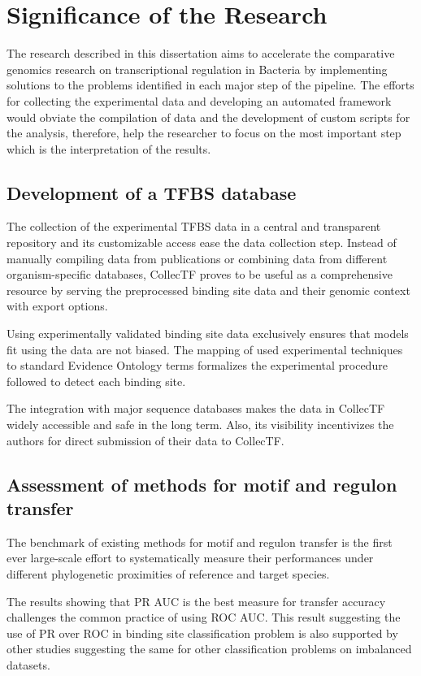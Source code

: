 \section{Significance of the Research}

The research described in this dissertation aims to accelerate the comparative
genomics research on transcriptional regulation in Bacteria by implementing
solutions to the problems identified in each major step of the pipeline. The
efforts for collecting the experimental data and developing an automated
framework would obviate the compilation of data and the development of custom
scripts for the analysis, therefore, help the researcher to focus on the
most important step which is the interpretation of the results.

\subsection{Development of a TFBS database}

The collection of the experimental TFBS data in a central and transparent
repository and its customizable access ease the data collection step. Instead
of manually compiling data from publications or combining data from different
organism-specific databases, CollecTF proves to be useful as a comprehensive
resource by serving the preprocessed binding site data and their genomic
context with export options.

Using experimentally validated binding site data exclusively ensures that
models fit using the data are not biased. The mapping of used experimental
techniques to standard Evidence Ontology terms formalizes the experimental
procedure followed to detect each binding site.

The integration with major sequence databases makes the data in CollecTF widely
accessible and safe in the long term. Also, its visibility incentivizes the
authors for direct submission of their data to CollecTF.

\subsection{Assessment of methods for motif and regulon transfer}

The benchmark of existing methods for motif and regulon transfer is the first
ever large-scale effort to systematically measure their performances under
different phylogenetic proximities of reference and target species.

The results showing that PR AUC is the best measure for transfer accuracy
challenges the common practice of using ROC AUC\@. This result suggesting the
use of PR over ROC in binding site classification problem is also supported by
other studies suggesting the same for other classification problems on
imbalanced datasets.

